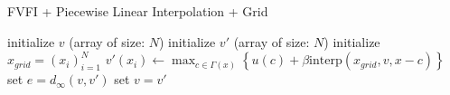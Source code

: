 \documentclass{article}
\begin{document}
\begin{algorithm}
  \caption{FVFI + Piecewise Linear Interpolation + Grid}
  \begin{algorithmic}
    \State initialize $v$ (array of size: $N$)
    \State initialize $v'$ (array of size: $N$)
    \State initialize $x_{grid}=\left(x_{i}\right)_{i=1}^{N}$
    \Repeat
        \State $v'\left(x_{i}\right)\gets \max_{c\in\Gamma\left(x\right)}\left\{ u\left(c\right)+\beta\mathrm{interp}\left(x_{grid},v,x-c\right)\right\} $
      \EndFor
      \State set $e=d_{\infty}\left(v,v'\right)$
      \State set $v=v'$
  \end{algorithmic}
\end{algorithm}
\end{document}
